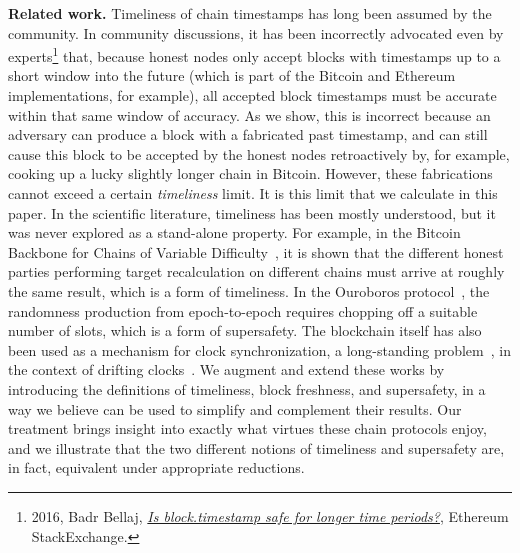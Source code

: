 \noindent
\textbf{Related work.}
Timeliness of chain timestamps has long been assumed by the community.
In community discussions, it has been incorrectly
advocated even by experts\footnote{2016, Badr Bellaj, \href{https://ethereum.stackexchange.com/questions/6795/is-block-timestamp-safe-for-longer-time-periods}{\emph{Is block.timestamp safe for longer time periods?}}, Ethereum StackExchange.} that, because
honest nodes only accept blocks with timestamps up to a short window into the future
(which is part of the Bitcoin and Ethereum implementations, for example),
all accepted block timestamps must be accurate within that same window of accuracy.
As we show, this is incorrect because an adversary can produce a block with a fabricated past timestamp,
and can still cause this block to be accepted by the honest nodes retroactively by, for example, cooking
up a lucky slightly longer chain in Bitcoin. However, these fabrications
cannot exceed a certain \emph{timeliness} limit. It is this limit that we calculate in this paper.
In the scientific literature, timeliness has been mostly understood, but it was never explored
as a stand-alone property. For example, in the Bitcoin Backbone for Chains of Variable Difficulty~\cite{varbackbone},
it is shown that the different honest parties performing target recalculation on different chains
must arrive at roughly the same result, which is a form of timeliness. In the Ouroboros protocol~\cite{ouroboros},
the randomness production from epoch-to-epoch requires chopping off a suitable number of slots,
which is a form of supersafety. The blockchain itself has also been used as a mechanism for clock
synchronization, a long-standing problem~\cite{lamport-synchronizing-clocks}, in the context of drifting
clocks~\cite{klepsydra,chronos}. We augment and extend
these works by introducing the definitions of timeliness, block freshness, and supersafety, in a way
we believe can be used to simplify and complement their results. Our treatment brings insight into
exactly what virtues these chain protocols enjoy, and we illustrate that the two different
notions of timeliness and supersafety are, in fact, equivalent under appropriate reductions.
